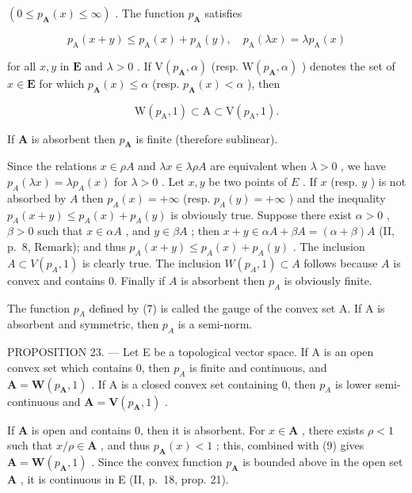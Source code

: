 \((0 \leqslant p_{\mathbf{A}}(x) \leqslant \infty)\) . The function \(p_{\mathbf{A}}\) satisfies

\[
p _ {\mathrm{A}} (x + y) \leqslant p _ {\mathrm{A}} (x) + p _ {\mathrm{A}} (y), \quad p _ {\mathrm{A}} (\lambda x) = \lambda p _ {\mathrm{A}} (x)\tag{8}
\]

for all \(x, y\) in \(\mathbf{E}\) and \(\lambda > 0\) . If \(\mathrm{V}(p_{\mathbf{A}}, \alpha)\) (resp. \(\mathrm{W}(p_{\mathbf{A}}, \alpha)\) ) denotes the set of \(x \in \mathbf{E}\) for which \(p_{\mathbf{A}}(x) \leqslant \alpha\) (resp. \(p_{\mathbf{A}}(x) < \alpha\) ), then

\[
\mathrm{W} (p _ {\mathrm{A}}, 1) \subset \mathrm{A} \subset \mathrm{V} (p _ {\mathrm{A}}, 1).\tag{9}
\]

If \(\mathbf{A}\) is absorbent then \(p_{\mathbf{A}}\) is finite (therefore sublinear).

Since the relations \(x \in \rho A\) and \(\lambda x \in \lambda \rho A\) are equivalent when \(\lambda > 0\) , we have \(p_A(\lambda x) = \lambda p_A(x)\) for \(\lambda > 0\) . Let \(x, y\) be two points of \(E\) . If \(x\) (resp. \(y\) ) is not absorbed by \(A\) then \(p_A(x) = +\infty\) (resp. \(p_A(y) = +\infty\) ) and the inequality \(p_A(x + y) \leqslant p_A(x) + p_A(y)\) is obviously true. Suppose there exist \(\alpha > 0\) , \(\beta > 0\) such that \(x \in \alpha A\) , and \(y \in \beta A\) ; then \(x + y \in \alpha A + \beta A = (\alpha + \beta)A\) (II, p.~8, Remark); and thus \(p_A(x + y) \leqslant p_A(x) + p_A(y)\) . The inclusion \(A \subset V(p_A, 1)\) is clearly true. The inclusion \(W(p_A, 1) \subset A\) follows because \(A\) is convex and contains 0. Finally if \(A\) is absorbent then \(p_A\) is obviously finite.

The function \(p_{A}\) defined by (7) is called the gauge of the convex set A. If A is absorbent and symmetric, then \(p_{A}\) is a semi-norm.

PROPOSITION 23. --- Let E be a topological vector space. If A is an open convex set which contains 0, then \(p_{A}\) is finite and continuous, and \(\mathbf{A} = \mathbf{W}(p_{\mathbf{A}}, 1)\) . If A is a closed convex set containing 0, then \(p_{A}\) is lower semi-continuous and \(\mathbf{A} = \mathbf{V}(p_{\mathbf{A}}, 1)\) .

If \(\mathbf{A}\) is open and contains 0, then it is absorbent. For \(x \in \mathbf{A}\) , there exists \(\rho < 1\) such that \(x / \rho \in \mathbf{A}\) , and thus \(p_{\mathbf{A}}(x) < 1\) ; this, combined with (9) gives \(\mathbf{A} = \mathbf{W}(p_{\mathbf{A}}, 1)\) . Since the convex function \(p_{\mathbf{A}}\) is bounded above in the open set \(\mathbf{A}\) , it is continuous in E (II, p.~18, prop. 21).

